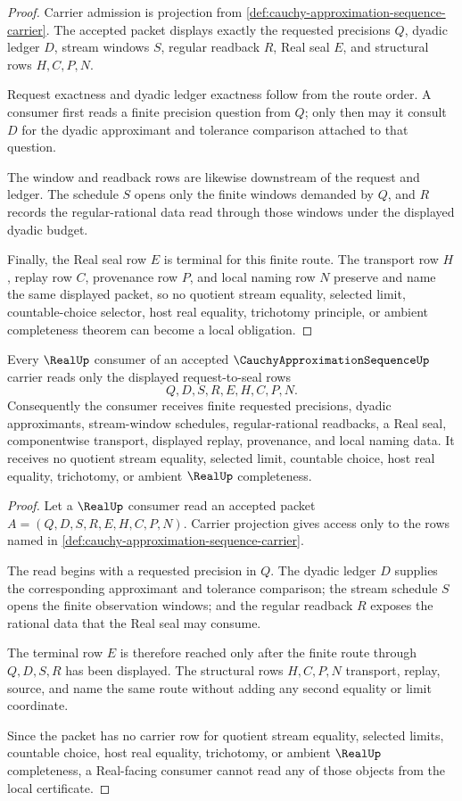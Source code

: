 \begin{proof}
Carrier admission is projection from \autoref{def:cauchy-approximation-sequence-carrier}. The accepted packet displays exactly the requested precisions $Q$, dyadic ledger $D$, stream windows $S$, regular readback $R$, Real seal $E$, and structural rows $H,C,P,N$.

Request exactness and dyadic ledger exactness follow from the route order. A consumer first reads a finite precision question from $Q$; only then may it consult $D$ for the dyadic approximant and tolerance comparison attached to that question.

The window and readback rows are likewise downstream of the request and ledger. The schedule $S$ opens only the finite windows demanded by $Q$, and $R$ records the regular-rational data read through those windows under the displayed dyadic budget.

Finally, the Real seal row $E$ is terminal for this finite route. The transport row $H$, replay row $C$, provenance row $P$, and local naming row $N$ preserve and name the same displayed packet, so no quotient stream equality, selected limit, countable-choice selector, host real equality, trichotomy principle, or ambient completeness theorem can become a local obligation.
\end{proof}

\begin{theorem}\label{thm:cauchy-approximation-sequence-real-seal-boundary}
Every $\RealUp$ consumer of an accepted $\CauchyApproximationSequenceUp$ carrier reads only the displayed request-to-seal rows
$$
Q,D,S,R,E,H,C,P,N .
$$
Consequently the consumer receives finite requested precisions, dyadic approximants, stream-window schedules, regular-rational readbacks, a Real seal, componentwise transport, displayed replay, provenance, and local naming data. It receives no quotient stream equality, selected limit, countable choice, host real equality, trichotomy, or ambient $\RealUp$ completeness.
\end{theorem}
\begin{proof}
Let a $\RealUp$ consumer read an accepted packet $A=(Q,D,S,R,E,H,C,P,N)$. Carrier projection gives access only to the rows named in \autoref{def:cauchy-approximation-sequence-carrier}.

The read begins with a requested precision in $Q$. The dyadic ledger $D$ supplies the corresponding approximant and tolerance comparison; the stream schedule $S$ opens the finite observation windows; and the regular readback $R$ exposes the rational data that the Real seal may consume.

The terminal row $E$ is therefore reached only after the finite route through $Q,D,S,R$ has been displayed. The structural rows $H,C,P,N$ transport, replay, source, and name the same route without adding any second equality or limit coordinate.

Since the packet has no carrier row for quotient stream equality, selected limits, countable choice, host real equality, trichotomy, or ambient $\RealUp$ completeness, a Real-facing consumer cannot read any of those objects from the local certificate.
\end{proof}

